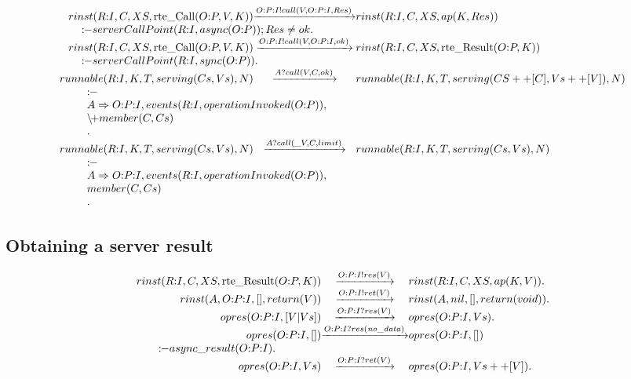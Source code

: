 \newcommand{\Pcontline}[1]{\\\multicolumn{3}{l}{\qquad #1}}
\newcommand{\Pbackslashplus}{\mathbin{\backslash\!{+}}}
\[
\begin{array}{r@{}c@{}l}
  \Preduce{rinst(R{:}I, C, XS, \rte{Call}(O{:}P,V,K))}{\Psay{O{:}P{:}I}{call(V,O{:}P{:}I,Res)}}{rinst(R{:}I, C, XS, ap(K,Res))}
  \Pcontline{\Pif serverCallPoint(R{:}I, async(O{:}P)) ; Res \neq ok   .}
\\\Preduce{rinst(R{:}I, C, XS, \rte{Call}(O{:}P,V,K))}{\Psay{O{:}P{:}I}{call(V,O{:}P{:}I,ok)}}{rinst(R{:}I, C, XS, \rte{Result}(O{:}P,K))}
  \Pcontline{\Pif serverCallPoint(R{:}I, sync(O{:}P))  .}
\\\Preduce{runnable(R{:}I, K, T, serving(Cs,Vs), N)}{\Phear{A}{call(V,C,ok)}}{runnable(R{:}I, K, T, serving(CS++[C],Vs++[V]), N)}
  \Pcontline{\begin{array}{l}
               \Pif
             \\A\Rightarrow{}O{:}P{:}I, events(R{:}I, operationInvoked(O{:}P)),
             \\\Pbackslashplus member(C, Cs)
             \\.
             \end{array}}
\\\Preduce{runnable(R{:}I, K, T, serving(Cs,Vs), N)}{\Phear{A}{call(\_V,C,limit)}}{runnable(R{:}I, K, T, serving(Cs,Vs), N)}
  \Pcontline{\begin{array}{l}
               \Pif
             \\A\Rightarrow{}O{:}P{:}I, events(R{:}I, operationInvoked(O{:}P)),
             \\member(C, Cs)
             \\.
             \end{array}}
\end{array}
\]


\subsection{Obtaining a server result}

\[
\begin{array}{r@{}c@{}l}
  \Preduce{rinst(R{:}I, C, XS, \rte{Result}(O{:}P,K))}{\Psay {O{:}P{:}I}{res(V)}}         {rinst(R{:}I, C, XS, ap(K,V))}  .
\\\Preduce{rinst(A, O{:}P{:}I, [], return(V))        }{\Psay {O{:}P{:}I}{ret(V)}}         {rinst(A, nil, [], return(void))}.
\\\Preduce{opres(O{:}P{:}I, [V|Vs])                  }{\Phear{O{:}P{:}I}{res(V)}}        {opres(O{:}P{:}I, Vs)}               .
\\\Preduce{opres(O{:}P{:}I, [])                      }{\Phear{O{:}P{:}I}{res(\nodata)}}  {opres(O{:}P{:}I, [])}
  \Pcontline{\Pif    async\_result(O{:}P{:}I)   .}
\\\Preduce{opres(O{:}P{:}I, Vs)                      }{\Phear{O{:}P{:}I}{ret(V)}}        {opres(O{:}P{:}I, Vs++[V])} .
\end{array}
\]


